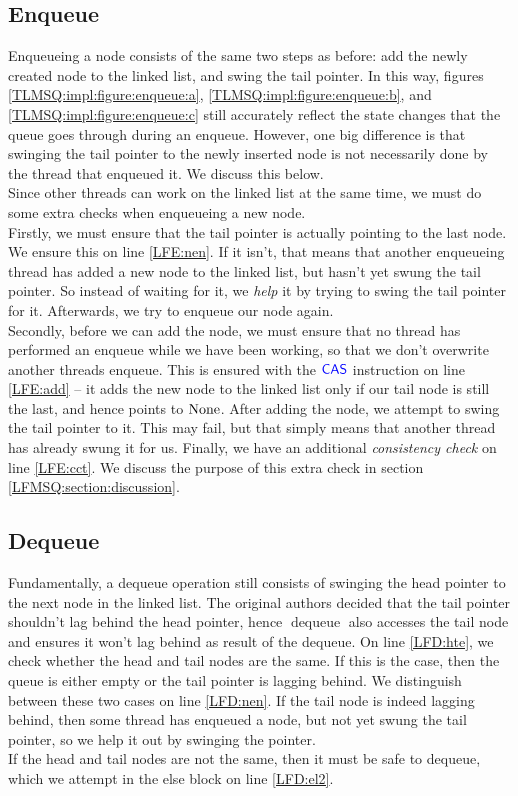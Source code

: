 \documentclass[a4paper, 10pt]{report}
\theoremstyle{definition}
\newcommand{\dequeue}{\operatorname{dequeue}}
\begin{document}
\subsection{Enqueue}
Enqueueing a node consists of the same two steps as before: add the newly created node to the linked list, and swing the tail pointer. In this way, figures \ref{TLMSQ:impl:figure:enqueue:a}, \ref{TLMSQ:impl:figure:enqueue:b}, and \ref{TLMSQ:impl:figure:enqueue:c} still accurately reflect the state changes that the queue goes through during an enqueue. However, one big difference is that swinging the tail pointer to the newly inserted node is not necessarily done by the thread that enqueued it. We discuss this below.\\
Since other threads can work on the linked list at the same time, we must do some extra checks when enqueueing a new node.\\
Firstly, we must ensure that the tail pointer is actually pointing to the last node. We ensure this on line \ref{LFE:nen}. If it isn't, that means that another enqueueing thread has added a new node to the linked list, but hasn't yet swung the tail pointer. So instead of waiting for it, we \textit{help} it by trying to swing the tail pointer for it. Afterwards, we try to enqueue our node again.\\
Secondly, before we can add the node, we must ensure that no thread has performed an enqueue while we have been working, so that we don't overwrite another threads enqueue. This is ensured with the $\textsf{\color{blue} CAS}$ instruction on line \ref{LFE:add} -- it adds the new node to the linked list only if our tail node is still the last, and hence points to $\operatorname{None}$. After adding the node, we attempt to swing the tail pointer to it. This may fail, but that simply means that another thread has already swung it for us.
Finally, we have an additional \textit{consistency check} on line \ref{LFE:cct}. We discuss the purpose of this extra check in section \ref{LFMSQ:section:discussion}.

\subsection{Dequeue}
Fundamentally, a dequeue operation still consists of swinging the head pointer to the next node in the linked list. The original authors decided that the tail pointer shouldn't lag behind the head pointer, hence $\dequeue$ also accesses the tail node and ensures it won't lag behind as result of the dequeue. On line \ref{LFD:hte}, we check whether the head and tail nodes are the same. If this is the case, then the queue is either empty or the tail pointer is lagging behind. We distinguish between these two cases on line \ref{LFD:nen}. If the tail node is indeed lagging behind, then some thread has enqueued a node, but not yet swung the tail pointer, so we help it out by swinging the pointer.\\
If the head and tail nodes are not the same, then it must be safe to dequeue, which we attempt in the else block on line \ref{LFD:el2}.
\end{document}
